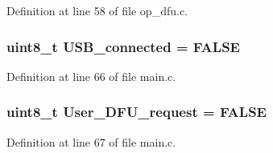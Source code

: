 \-Definition at line 58 of file op\-\_\-dfu.\-c.

\hypertarget{group___copter_control_b_l_gac2fd478a40cb67cd7b769eb34ed0a063}{
\subsubsection[{\-U\-S\-B\-\_\-connected}]{\setlength{\rightskip}{0pt plus 5cm}uint8\-\_\-t {\bf \-U\-S\-B\-\_\-connected} = \-F\-A\-L\-S\-E}}\label{group___copter_control_b_l_gac2fd478a40cb67cd7b769eb34ed0a063}


\-Definition at line 66 of file main.\-c.

\hypertarget{group___copter_control_b_l_ga4e35257eb1d649bd7353cb4a4d37d5fb}{
\subsubsection[{\-User\-\_\-\-D\-F\-U\-\_\-request}]{\setlength{\rightskip}{0pt plus 5cm}uint8\-\_\-t {\bf \-User\-\_\-\-D\-F\-U\-\_\-request} = \-F\-A\-L\-S\-E}}\label{group___copter_control_b_l_ga4e35257eb1d649bd7353cb4a4d37d5fb}


\-Definition at line 67 of file main.\-c.

